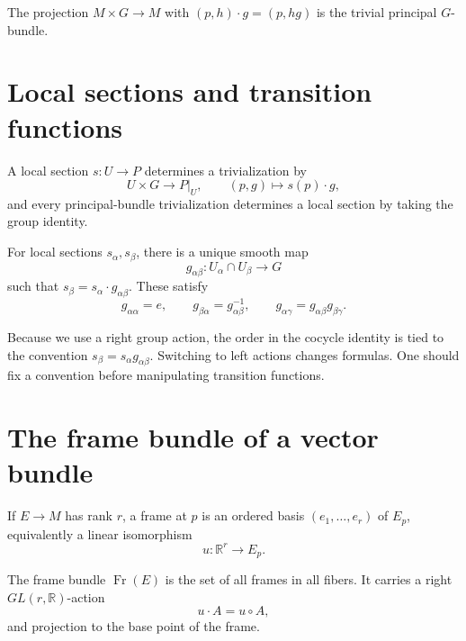 \begin{example}\label{ex:vii08-trivial}
The projection \(M\times G\to M\) with \((p,h)\cdot g=(p,hg)\) is the trivial principal \(G\)-bundle.
\end{example}

\section{Local sections and transition functions}
\begin{proposition}\label{prop:vii08-local-section}
A local section \(s:U\to P\) determines a trivialization by
\[
U\times G\to P|_U,\qquad (p,g)\mapsto s(p)\cdot g,
\]
and every principal-bundle trivialization determines a local section by taking the group identity.
\end{proposition}

\begin{theorem}\label{thm:vii08-transition}
For local sections \(s_\alpha,s_\beta\), there is a unique smooth map
\[
g_{\alpha\beta}:U_\alpha\cap U_\beta\to G
\]
such that \(s_\beta=s_\alpha\cdot g_{\alpha\beta}\). These satisfy
\[
g_{\alpha\alpha}=e,\qquad g_{\beta\alpha}=g_{\alpha\beta}^{-1},\qquad
g_{\alpha\gamma}=g_{\alpha\beta}g_{\beta\gamma}.
\]
\end{theorem}

\begin{warning}\label{warning:vii08-convention}
Because we use a right group action, the order in the cocycle identity is tied to the convention \(s_\beta=s_\alpha g_{\alpha\beta}\). Switching to left actions changes formulas. One should fix a convention before manipulating transition functions.
\end{warning}

\section{The frame bundle of a vector bundle}
\begin{definition}[Frame]\label{def:vii08-frame}
If \(E\to M\) has rank \(r\), a frame at \(p\) is an ordered basis \((e_1,\ldots,e_r)\) of \(E_p\), equivalently a linear isomorphism
\[
u:\mathbb R^r\to E_p.
\]
\end{definition}

\begin{definition}\label{def:vii08-frame-bundle}
The frame bundle \(\operatorname{Fr}(E)\) is the set of all frames in all fibers. It carries a right \(GL(r,\mathbb R)\)-action
\[
u\cdot A=u\circ A,
\]
and projection to the base point of the frame.
\end{definition}

